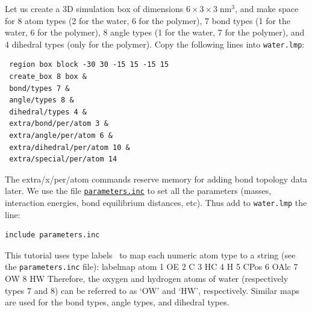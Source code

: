 \documentclass[9pt,tutorial]{livecoms}
\newcommand{\lmpcmd}[1]{\colorbox{listing}{\textcolor{command}{\small{#1}}}} %
\newcommand{\lmpcmdnote}[1]{\colorbox{note_listing}{\textcolor{command}{\small{#1}}}} %
\newcommand{\flecmd}[1]{\textcolor{command}{\texttt{#1}}} %
\newcommand{\dwlcmd}[1]{\textcolor{download}{\texttt{#1}}} %
\newcommand{\filepath}{https://raw.githubusercontent.com/lammpstutorials/lammpstutorials-article/main/files/}
\begin{document}
\noindent Let us create a 3D simulation box of dimensions $6 \times 3 \times 3 \; \text{nm}^3$,
and make space for 8 atom types (2 for the water, 6 for the polymer), 7 bond types
(1 for the water, 6 for the polymer), 8 angle types (1 for the water, 7 for the polymer),
and 4 dihedral types (only for the polymer).  Copy the following lines into \flecmd{water.lmp}:
\begin{lstlisting}
 region box block -30 30 -15 15 -15 15
 create_box 8 box &
 bond/types 7 &
 angle/types 8 &
 dihedral/types 4 &
 extra/bond/per/atom 3 &
 extra/angle/per/atom 6 &
 extra/dihedral/per/atom 10 &
 extra/special/per/atom 14
\end{lstlisting}
The \lmpcmd{extra/x/per/atom} commands reserve memory for adding bond topology
data later. We use the file \href{\filepath tutorial3/parameters.inc}{\dwlcmd{parameters.inc}}
to set all the parameters (masses, interaction energies, bond equilibrium
distances, etc).  Thus add to \flecmd{water.lmp} the line:
\begin{lstlisting}
include parameters.inc
\end{lstlisting}

\begin{note}
  This tutorial uses type labels~\cite{gissinger2024type} to map each
  numeric atom type to a string (see the \flecmd{parameters.inc} file):
  \lmpcmdnote{labelmap atom 1 OE 2 C 3 HC 4 H 5 CPos 6 OAlc 7 OW 8 HW}
  Therefore, the oxygen and hydrogen atoms of water (respectively types
  7 and 8) can be referred to as `OW' and `HW', respectively.  Similar
  maps are used for the bond types, angle types, and dihedral types.
\end{note}
\end{document}
